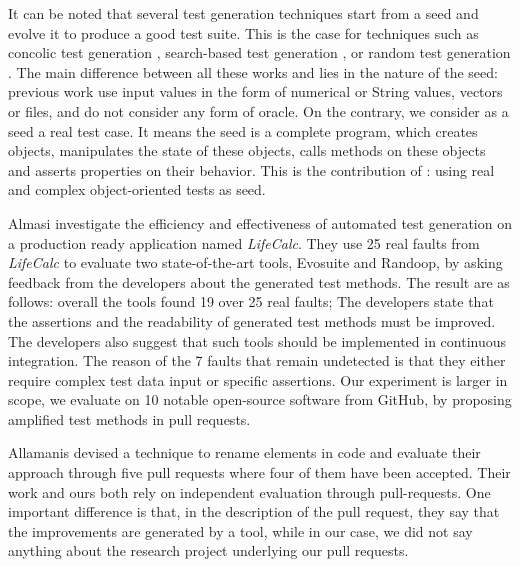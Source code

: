 It can be noted that several test generation techniques start from a seed and evolve it to produce a good test suite. This is the case for techniques such as concolic test generation \cite{godefroid2005dart}, search-based test generation \cite{fraser2012seed}, or random  test generation \cite{groce2007randomized}. The main difference between all these works and \dspot lies in the nature of the seed: previous work use input values in the form of numerical or String values, vectors or files, and do not consider any form of oracle. On the contrary, we consider as a seed a real test case.
It means the seed is a complete program, which creates objects, manipulates the state of these objects, calls methods on these objects and asserts properties on their behavior. This is the contribution of \dspot: using real and complex object-oriented tests as seed.


Almasi \etal \cite{IndustrialEvalAlmasi2017} investigate the efficiency and effectiveness of automated test generation on a production ready application named \emph{LifeCalc}. They use 25 real faults from \emph{LifeCalc} to evaluate two state-of-the-art tools, Evosuite and Randoop, by asking feedback from the developers about the generated test methods. The result are as follows:  overall the tools found 19 over 25 real faults; 
The developers state that the assertions and the readability of generated test methods must be improved. The developers also suggest that such tools should be implemented in continuous integration.
The reason of the 7 faults that remain undetected is that they either require complex test data input or specific assertions. Our experiment is larger in scope, we evaluate \dspot on 10 notable open-source software from GitHub, by proposing amplified test methods in pull requests.

Allamanis \etal \cite{pull:request:evaluation} devised a technique to rename elements in code and evaluate their approach through five pull requests where four of them have been accepted. Their work and ours both rely on independent evaluation through pull-requests. One important difference is that, in the description of the pull request, they say that the improvements are generated by a tool, while in our case, we did not say anything about the research project underlying our pull requests.



